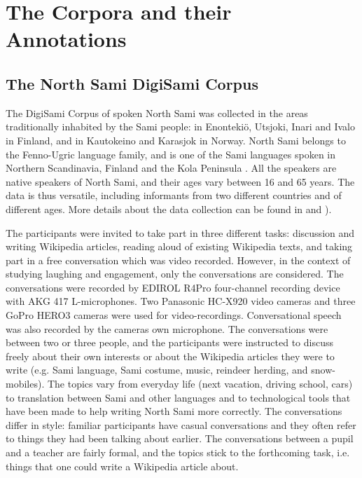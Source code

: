 \documentclass[10pt,journal,compsoc]{IEEEtran}
\begin{document}
\section{The Corpora and their Annotations}
\label{sec:corpora-annotations}

\subsection{The North Sami DigiSami Corpus}
\label{sec:digisami-corpus}

The DigiSami Corpus of spoken North Sami was collected in the areas traditionally inhabited by the Sami people: in Enonteki\"{o}, Utsjoki, Inari and Ivalo in Finland, and in Kautokeino and Karasjok in Norway.
North Sami belongs to the Fenno-Ugric language family, and is one of the Sami languages
spoken in Northern Scandinavia, Finland and the Kola Peninsula \cite{Hirvonen:ea:97}.
All the speakers are native speakers of North Sami, and their ages vary between 16 and 65 years.
The data is thus versatile, including informants from two different countries and of different ages.
More details about the data collection can be found in \cite{Jokinen:Wilcock:SLTU:14} and \cite{Jokinen:LREC:14}).

The participants were invited to take part in three different tasks: discussion and writing Wikipedia articles, reading aloud of existing Wikipedia texts, and taking part in a free conversation which was video recorded. However, in the context of studying laughing and engagement, only the conversations are considered.
The conversations were recorded by EDIROL R4Pro four-channel recording device with AKG 417 L-microphones. Two Panasonic HC-X920 video cameras and three GoPro HERO3 cameras were used for video-recordings. Conversational speech was also recorded by the cameras own microphone. The conversations were between two or three people, and the participants were instructed to discuss freely about their own interests or about the Wikipedia articles they were to write (e.g. Sami language, Sami costume, music, reindeer herding, and snow-mobiles). The topics vary from everyday life (next vacation, driving school, cars) to translation between Sami and other languages and to technological tools that have been made to help writing North Sami more correctly. The conversations differ in style: familiar participants have casual conversations and they often refer to things they had been talking about earlier. The conversations between a pupil and a teacher are fairly formal, and the topics stick to the forthcoming task, i.e. things that one could write a Wikipedia article about.
\end{document}
